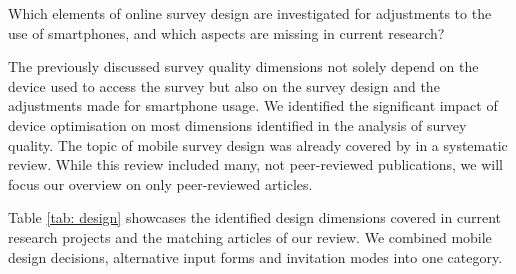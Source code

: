 Which elements of online survey design are investigated for adjustments to the use of smartphones, and which aspects are missing in current research?

The previously discussed survey quality dimensions not solely depend on the device used to access the survey but also on the survey design and the adjustments made for smartphone usage. We identified the significant impact of device optimisation on most dimensions identified in the analysis of survey quality. The topic of mobile survey design was already covered by \cite{antoun_design_2018} in a systematic review. While this review included many, not peer-reviewed publications, we will focus our overview on only peer-reviewed articles. 

Table \ref{tab: design} showcases the identified design dimensions covered in current research projects and the matching articles of our review. We combined mobile design decisions, alternative input forms and invitation modes into one category. 

